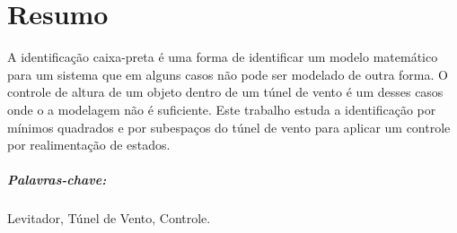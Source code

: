 \chapter*{Resumo}
\thispagestyle{empty}

A identificação caixa-preta é uma forma de identificar um modelo matemático para um sistema que em alguns casos não pode ser modelado de outra forma. O controle de altura de um objeto dentro de um túnel de vento é um desses casos onde o a modelagem não é suficiente. Este trabalho estuda a identificação por mínimos quadrados e por subespaços do túnel de vento para aplicar um controle por realimentação de estados.

\vspace{50pt}

\paragraph{Palavras-chave:} Levitador, Túnel de Vento, Controle.
